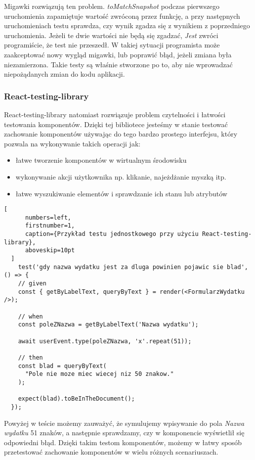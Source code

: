 \begin{description}
  Migawki rozwiązują ten problem. \emph{toMatchSnapshot} podczas pierwszego uruchomienia zapamiętuje wartość zwróconą przez funkcję, a przy następnych uruchomieniach testu sprawdza, czy wynik zgadza się z wynikiem z poprzedniego uruchomienia. Jeżeli te dwie wartości nie będą się zgadzać, \emph{Jest} zwróci programiście, że test nie przeszedł. W takiej sytuacji programista może zaakceptować nowy wygląd migawki, lub poprawić błąd, jeżeli zmiana była niezamierzona. Takie testy są właśnie stworzone po to, aby nie wprowadzać niepożądanych zmian do kodu aplikacji.

\subsubsection{React-testing-library} React-testing-library natomiast rozwiązuje problem czytelności i łatwości testowania komponentów. Dzięki tej bibliotece jesteśmy w stanie testować zachowanie komponentów używając do tego bardzo prostego interfejsu, który pozwala na wykonywanie takich operacji jak:
\begin{itemize}
  \item łatwe tworzenie komponentów w wirtualnym środowisku
  \item wykonywanie akcji użytkownika np. klikanie, najeżdżanie myszką itp.
  \item łatwe wyszukiwanie elementów i sprawdzanie ich stanu lub atrybutów
\end{itemize}


\end{description}
  \begin{addmargin}[6mm]{0mm}
  \begin{lstlisting}[
      numbers=left,
      firstnumber=1,
      caption={Przykład testu jednostkowego przy użyciu React-testing-library},
      aboveskip=10pt
  ]
    test('gdy nazwa wydatku jest za dluga powinien pojawic sie blad', () => {
    // given
    const { getByLabelText, queryByText } = render(<FormularzWydatku />);

    // when
    const poleZNazwa = getByLabelText('Nazwa wydatku');

    await userEvent.type(poleZNazwa, 'x'.repeat(51));

    // then
    const blad = queryByText(
      "Pole nie moze miec wiecej niz 50 znakow."
    );

    expect(blad).toBeInTheDocument();
  });
  \end{lstlisting}
  \end{addmargin}
  Powyżej w teście możemy zauważyć, że symulujemy wpisywanie do pola \emph{Nazwa wydatku} 51 znaków, a następnie sprawdzamy, czy w komponencie wyświetlił się odpowiedni błąd. Dzięki takim testom komponentów, możemy w łatwy sposób przetestować zachowanie komponentów w wielu różnych scenariuszach.

